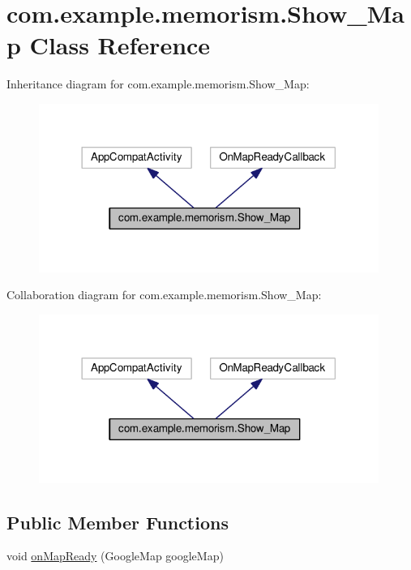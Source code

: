 \hypertarget{classcom_1_1example_1_1memorism_1_1_show___map}{}\section{com.\+example.\+memorism.\+Show\+\_\+\+Map Class Reference}
\label{classcom_1_1example_1_1memorism_1_1_show___map}


Inheritance diagram for com.\+example.\+memorism.\+Show\+\_\+\+Map\+:
\nopagebreak
\begin{figure}[H]
\begin{center}
\leavevmode
\includegraphics[width=314pt]{d5/dec/classcom_1_1example_1_1memorism_1_1_show___map__inherit__graph}
\end{center}
\end{figure}


Collaboration diagram for com.\+example.\+memorism.\+Show\+\_\+\+Map\+:
\nopagebreak
\begin{figure}[H]
\begin{center}
\leavevmode
\includegraphics[width=314pt]{d3/ddc/classcom_1_1example_1_1memorism_1_1_show___map__coll__graph}
\end{center}
\end{figure}
\subsection*{Public Member Functions}
\begin{DoxyCompactItemize}
\item 
void \hyperlink{classcom_1_1example_1_1memorism_1_1_show___map_a1db450c9105bdeeb9cb57a6253d0cbc4}{on\+Map\+Ready} (Google\+Map google\+Map)
\end{DoxyCompactItemize}
